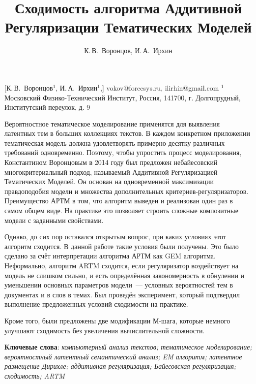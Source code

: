 \documentclass[12pt, twoside]{article}
\begin{document}
\title
    {Сходимость алгоритма Аддитивной Регуляризации Тематических Моделей}
\author
    { К.\,В.~Воронцов, И.\,А.~Ирхин}
    [К.\,В.~Воронцов$^{1}$, И.\,А.~Ирхин$^1$,]
\email
{vokov@forecsys.ru, ilirhin@gmail.com}
\organization
    {$^1$Московский Физико-Технический Институт, Россия, 141700, г. Долгопрудный, Институтский переулок, д. 9}
\abstract
{
Вероятностное тематическое моделирование применятся для выявления  латентных тем в больших коллекциях текстов. В каждом конкретном приложении тематическая модель должна удовлетворять примерно десятку различных требований одновременно. Поэтому, чтобы упростить процесс моделирования, Константином Воронцовым в 2014 году был предложен небайесовский многокритериальный подход, называемый Аддитивной Регуляризацией Тематических Моделей. Он основан на одновременной максимизации правдоподобия модели и множества дополнительных критериев-регуляризаторов. Преимущество АРТМ в том, что алгоритм выведен и реализован один раз в самом общем виде. На практике это позволяет строить сложные композитные модели с заданными свойствами.

Однако, до сих пор оставался открытым вопрос, при каких условиях этот алгоритм сходится. В данной работе такие условия были получены. Это было сделано за счёт интерпретации алгоритма АРТМ как GEM алгоритма. Неформально, алгоритм ARTM сходится, если регуляризатор воздействует на модель не слишком сильно, и есть определённая закономерность в обнулении и уменьшении основных параметров модели~--- условных вероятностей тем в документах и в слов в темах. Был проведён эксперимент, который подтвердил выполнение предложенных условий сходимости на практике.

 Кроме того, были предложены две модификации М-шага, которые немного улучшают сходимость без увеличения вычислительной сложности. 	
\bigskip

\noindent
\textbf{Ключевые слова}: \emph { компьютерный анализ текстов; тематическое моделирование; вероятностный латентный семантический анализ; EM алгоритм; латентное размещение Дирихле; аддитивная регуляризация; Байесовская регуляризация; сходимость; ARTM}
}
\end{document}
